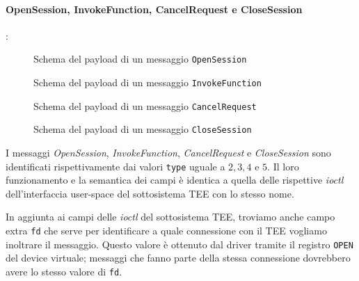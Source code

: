 \documentclass[12pt,italian]{report}
\begin{document}
\paragraph{OpenSession, InvokeFunction, CancelRequest e CloseSession}: \\
\begin{figure}[H]
    \centering
    \caption{Schema del payload di un messaggio \texttt{OpenSession}}
    \label{fig:msg-schema-opensession}
\end{figure}

\begin{figure}[H]
    \centering
    \caption{Schema del payload di un messaggio \texttt{InvokeFunction}}
    \label{fig:msg-schema-invokefunction}
\end{figure}

\begin{figure}[H]
    \centering
    \caption{Schema del payload di un messaggio \texttt{CancelRequest}}
    \label{fig:msg-schema-cancelrequest}
\end{figure}

\begin{figure}[h]
    \centering
    \caption{Schema del payload di un messaggio \texttt{CloseSession}}
    \label{fig:msg-schema-closesession}
\end{figure}

I messaggi \textit{OpenSession}, \textit{InvokeFunction},
\textit{CancelRequest} e \textit{CloseSession} sono identificati
rispettivamente dai valori \texttt{type} uguale a $2, 3, 4$ e $5$.
Il loro funzionamento e la semantica dei campi è identica a quella delle
rispettive \textit{ioctl} dell'interfaccia user-space del sottosistema TEE
con lo stesso nome.

In aggiunta ai campi delle \textit{ioctl} del sottosistema TEE, troviamo anche
campo extra \texttt{fd} che serve per identificare a quale connessione con
il TEE vogliamo inoltrare il messaggio.
Questo valore è ottenuto dal driver tramite il registro \texttt{OPEN} del
device virtuale; messaggi che fanno parte della stessa connessione dovrebbero
avere lo stesso valore di \texttt{fd}.
\end{document}
